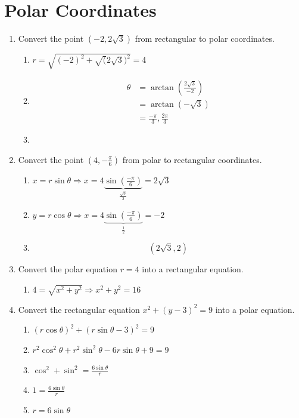 \documentclass[letter,11pt]{article}
\begin{document}
\section{Polar Coordinates}
\begin{enumerate}[label=\Alph*.]
    \item Convert the point $(-2,2\sqrt{3})$ from rectangular to polar coordinates.
    \begin{enumerate}
        \item $r=\sqrt{(-2)^2 + \sqrt(2\sqrt{3})^2} = 4$
        \item \begin{align*}
            \theta &= \arctan\left(\frac{2\sqrt{3}}{-2}\right)\\
            &= \arctan\left(-\sqrt{3}\right)\\
            &= \frac{-\pi}{3}, \frac{2\pi}{3}
        \end{align*}
        \item {}
    \end{enumerate}
    \item Convert the point $\left(4,-\frac{\pi}{6}\right)$ from polar to rectangular coordinates.
    \begin{enumerate}
        \item $x=r\sin\theta \Longrightarrow x = 4 \underbrace{\sin\left(\frac{-\pi}{6}\right)}_{\frac{\sqrt{3}}{2}} = 2\sqrt{3}$ 
        \item $y=r\cos\theta \Longrightarrow x = 4 \underbrace{\sin\left(\frac{-\pi}{6}\right)}_{\frac{1}{2}} = -2$
        \item $$\boxed{(2\sqrt{3},2)}$$
    \end{enumerate}
    \item  Convert the polar equation $r = 4$ into a rectangular equation.
    \begin{enumerate}
        \item $ 4 = \sqrt{x^2+y^2} \Longrightarrow \boxed{x^2+y^2 = 16}$
    \end{enumerate}
    \item  Convert the rectangular equation $x^2 + (y-3)^2 = 9$ into a polar equation.
    \begin{enumerate}
        \item $(r\cos\theta)^2+ (r\sin\theta -3)^2 = 9$
        \item $r^2\cos^2\theta+r^2\sin^2\theta - 6r\sin\theta +9 = 9$
        \item $\cos^2 + \sin^2 = \frac{6\sin\theta}{r}$
        \item $1 = \frac{6\sin\theta}{r}$
        \item $r=6\sin\theta$
    \end{enumerate}
\end{enumerate}
\end{document}
